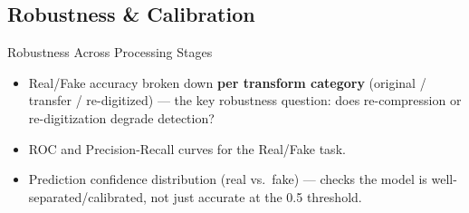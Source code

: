 \subsection{Robustness \& Calibration}

\begin{frame}{Robustness Across Processing Stages}
  \begin{itemize}
    \item Real/Fake accuracy broken down \textbf{per transform category} (original / transfer / re-digitized) — the key robustness question: does re-compression or re-digitization degrade detection?
    \item ROC and Precision-Recall curves for the Real/Fake task.
    \item Prediction confidence distribution (real vs.\ fake) — checks the model is well-separated/calibrated, not just accurate at the 0.5 threshold.
  \end{itemize}

  \vspace{.4em}
  \begin{columns}[T,onlytextwidth]
  \end{columns}
\end{frame}
